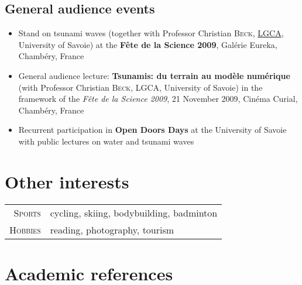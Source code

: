 \documentclass[final, a4paper, oneside, 12pt]{article}
\numberwithin{equation}{section}
\begin{document}
\subsection{General audience events}

\begin{itemize}

  \item Stand on tsunami waves (together with Professor Christian \textsc{Beck}, \href{http://lgca.univ-savoie.fr/}{LGCA}, University of Savoie) at the \textbf{F\^ete de la Science 2009}, Gal\'erie Eureka, Chamb\'ery, France
  
  \item General audience lecture: \textbf{Tsunamis: du terrain au mod\`ele num\'erique} (with Professor Christian \textsc{Beck}, LGCA, University of Savoie) in the framework of the \textit{F\^ete de la Science 2009}, 21 November 2009, Cin\'ema Curial, Chamb\'ery, France
  
  \item Recurrent participation in \textbf{Open Doors Days} at the University of Savoie with public lectures on water and tsunami waves

\end{itemize}

\section{Other interests}

    \begin{tabular}{r|l}
      \textsc{Sports} & cycling, skiing, bodybuilding, badminton \\
      \textsc{Hobbies} & reading, photography, tourism \\
    \end{tabular}

\section{Academic references}

\bigskip
\end{document}
